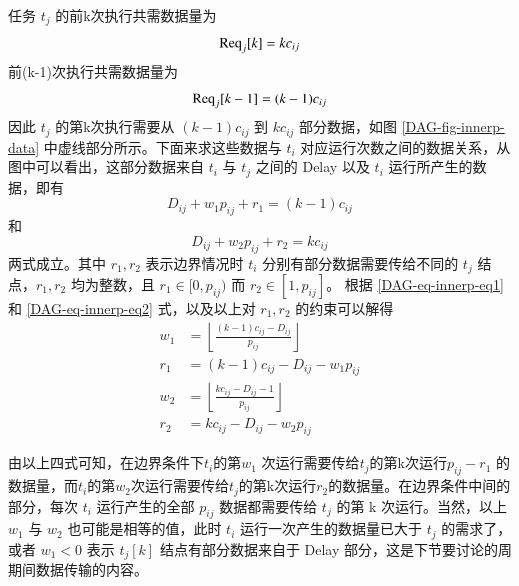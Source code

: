 任务 $t_j$ 的前k次执行共需数据量为
\begin{equation}
  \textnormal{Req}_{j}[k]=kc_{ij}
\end{equation}
前(k-1)次执行共需数据量为
\begin{equation}
  \textnormal{Req}_{j}[k-1]=(k-1)c_{ij}
\end{equation}
因此 $t_j$ 的第k次执行需要从 $(k-1)c_{ij}$ 到 $kc_{ij}$ 部分数据，如图 \ref{DAG-fig-innerp-data} 中虚线部分所示。下面来求这些数据与 $t_i$ 对应运行次数之间的数据关系，从图中可以看出，这部分数据来自 $t_i$ 与 $t_j$ 之间的 Delay 以及 $t_i$ 运行所产生的数据，即有
\begin{equation}\label{DAG-eq-innerp-eq1}
  D_{ij}+w_1p_{ij}+r_1=(k-1)c_{ij}
\end{equation}
和
\begin{equation}\label{DAG-eq-innerp-eq2}
  D_{ij}+w_2p_{ij}+r_2=kc_{ij}
\end{equation}
两式成立。其中 $r_1,r_2$ 表示边界情况时 $t_i$ 分别有部分数据需要传给不同的 $t_j$ 结点，$r_1,r_2$ 均为整数，且 $r_1\in[0,p_{ij})$ 而 $r_2\in[1,p_{ij}]$。
根据 \eqref{DAG-eq-innerp-eq1} 和 \eqref{DAG-eq-innerp-eq2} 式，以及以上对 $r_1,r_2$ 的约束可以解得
\begin{align}
  \label{DAG-eq-innerp-solve}
  w_1&=\left\lfloor\frac{(k-1)c_{ij}-D_{ij}}{p_{ij}}\right\rfloor\\
  r_1&=(k-1)c_{ij}-D_{ij}-w_1p_{ij}\\
  w_2&=\left\lfloor\frac{kc_{ij}-D_{ij}-1}{p_{ij}}\right\rfloor\\
  \label{DAG-eq-innerp-solve-ed}
  r_2&=kc_{ij}-D_{ij}-w_2p_{ij}
\end{align}

由以上四式可知，在边界条件下$t_i$的第$w_1$ 次运行需要传给$t_j$的第k次运行$p_{ij}-r_1$ 的数据量，而$t_i$的第$w_2$次运行需要传给$t_j$的第k次运行$r_2$的数据量。在边界条件中间的部分，每次 $t_i$ 运行产生的全部 $p_{ij}$ 数据都需要传给 $t_j$ 的第 k 次运行。当然，以上 $w_1$ 与 $w_2$ 也可能是相等的值，此时 $t_i$ 运行一次产生的数据量已大于 $t_j$ 的需求了，或者 $w_1<0$ 表示 $t_j[k]$ 结点有部分数据来自于 Delay 部分，这是下节要讨论的周期间数据传输的内容。


